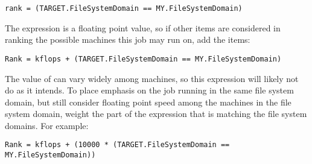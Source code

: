 \footnotesize
\begin{verbatim}
rank = (TARGET.FileSystemDomain == MY.FileSystemDomain)
\end{verbatim}
\normalsize

The  expression is a floating point value,
so if other items are considered in ranking the possible machines this job
may run on, add the items:

\footnotesize
\begin{verbatim}
Rank = kflops + (TARGET.FileSystemDomain == MY.FileSystemDomain)
\end{verbatim}
\normalsize

The value of  can vary widely among machines,
so this  expression will likely not do as it intends.
To place emphasis on the job running in the same file system domain,
but still consider floating point speed among the machines 
in the file system domain,
weight the part of the expression that is matching the file system domains.
For example: 

\footnotesize
\begin{verbatim}
Rank = kflops + (10000 * (TARGET.FileSystemDomain == MY.FileSystemDomain))
\end{verbatim}
\normalsize
